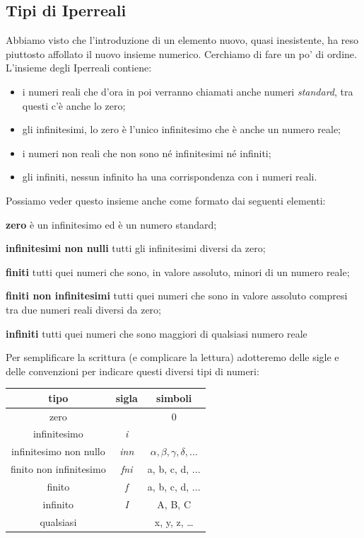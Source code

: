\subsection{Tipi di Iperreali}
\label{subsec:insnum_nonarchimedei}

Abbiamo visto che l'introduzione di un elemento nuovo, quasi inesistente, ha 
reso piuttosto affollato il nuovo insieme numerico. Cerchiamo di fare un po' 
di ordine. L'insieme degli Iperreali contiene:

\begin{itemize}
 \item i numeri reali che d'ora in poi verranno chiamati anche numeri 
\emph{standard}, tra questi c'è anche lo zero;
 \item gli infinitesimi, lo zero è l'unico infinitesimo che è anche un numero 
reale;
 \item i numeri non reali che non sono né infinitesimi né infiniti;
 \item gli infiniti, nessun infinito ha una corrispondenza con i numeri reali.
\end{itemize}

Possiamo veder questo insieme anche come formato dai seguenti elementi:

\begin{description}
 \item \textbf{zero}
 è un infinitesimo ed è un numero standard;
 \item \textbf{infinitesimi non nulli}
 tutti gli infinitesimi diversi da zero;
 \item \textbf{finiti}
 tutti quei numeri che sono, in valore assoluto, minori di un numero reale;
 \item \textbf{finiti non infinitesimi}
 tutti quei numeri che sono in valore assoluto compresi tra due numeri reali 
 diversi da zero;
 \item \textbf{infiniti}
 tutti quei numeri che sono maggiori di qualsiasi numero reale

\end{description}
 
Per semplificare la scrittura (e complicare la lettura) adotteremo delle sigle 
e delle convenzioni per indicare questi diversi tipi di numeri:

\begin{center}
\begin{tabular}{ccc}\toprule
tipo & sigla & simboli\\\midrule
zero &  & 0\\
infinitesimo & \emph{i} & \\
infinitesimo non nullo & \emph{inn} & $\alpha, \beta, \gamma, \delta, \dots$\\
finito non infinitesimo& \emph{fni} & a, b, c, d, ...\\
finito & \emph{f} & a, b, c, d, ...\\
infinito & \emph{I} & A, B, C\\
qualsiasi &  & x, y, z, \ldots\\\bottomrule
\end{tabular}
\label{tab:insnum_tipi}
\end{center}

